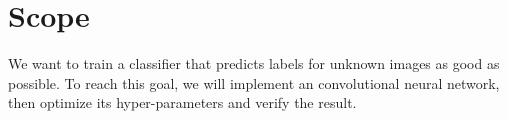 \section{Scope}
We want to train a classifier that predicts labels for unknown images as good as possible.
To reach this goal, we will implement an convolutional neural network, then optimize its hyper-parameters and verify the result.